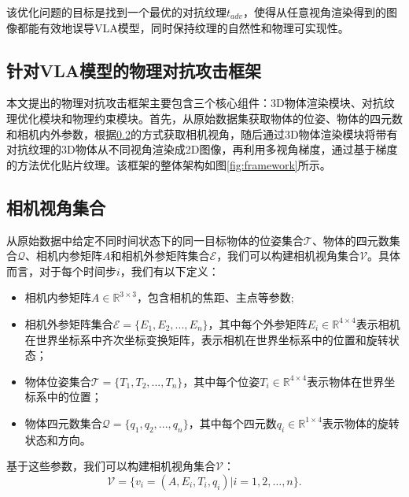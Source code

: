 该优化问题的目标是找到一个最优的对抗纹理$t_{adv}$，使得从任意视角渲染得到的图像都能有效地误导VLA模型，同时保持纹理的自然性和物理可实现性。
\subsection{针对VLA模型的物理对抗攻击框架}

本文提出的物理对抗攻击框架主要包含三个核心组件：3D物体渲染模块、对抗纹理优化模块和物理约束模块。首先，从原始数据集获取物体的位姿、物体的四元数和相机内外参数，根据\ref{camera_position}的方式获取相机视角，随后通过3D物体渲染模块将带有对抗纹理的3D物体从不同视角渲染成2D图像，再利用多视角梯度，通过基于梯度的方法优化贴片纹理。该框架的整体架构如图\ref{fig:framework}所示。

\subsection{相机视角集合}
\label{camera_position}

从原始数据中给定不同时间状态下的同一目标物体的位姿集合$\mathcal{T}$、物体的四元数集合$\mathcal{Q}$、相机内参矩阵$A$和相机外参矩阵集合$\mathcal{E}$，我们可以构建相机视角集合$\mathcal{V}$。具体而言，对于每个时间步$i$，我们有以下定义：

\begin{itemize}
    \item 相机内参矩阵$A \in \mathbb{R}^{3 \times 3}$，包含相机的焦距、主点等参数;
    \item 相机外参矩阵集合$\mathcal{E} = \{E_1, E_2, ..., E_n\}$，其中每个外参矩阵$E_i \in \mathbb{R}^{4 \times 4}$表示相机在世界坐标系中齐次坐标变换矩阵，表示相机在世界坐标系中的位置和旋转状态；
    \item 物体位姿集合$\mathcal{T} = \{T_1, T_2, ..., T_n\}$，其中每个位姿$T_i \in \mathbb{R}^{4 \times 4}$表示物体在世界坐标系中的位置；
    \item 物体四元数集合$\mathcal{Q} = \{q_1, q_2, ..., q_n\}$，其中每个四元数$q_i \in \mathbb{R}^{1 \times 4}$表示物体的旋转状态和方向。
\end{itemize}
 
基于这些参数，我们可以构建相机视角集合$\mathcal{V}$：
\begin{equation}
    \mathcal{V} = \{v_i = (A, E_i, T_i, q_i) | i = 1,2,\dots,n\}.
\end{equation}


